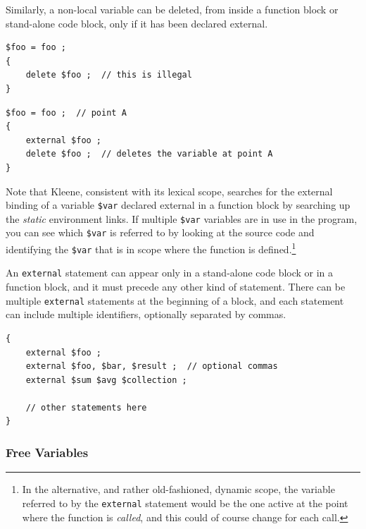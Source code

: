 \documentclass[letterpaper,12pt]{article}
\begin{document}
\noindent
Similarly, a non-local variable can be deleted, from inside a
function block or stand-alone code block, only if it has been
declared external.

\begin{samepage}
\begin{Verbatim}[fontsize=\small]
$foo = foo ;
{
    delete $foo ;  // this is illegal
}
\end{Verbatim}
\end{samepage}

\begin{samepage}
\begin{Verbatim}[fontsize=\small]
$foo = foo ;  // point A
{
    external $foo ;
    delete $foo ;  // deletes the variable at point A
}
\end{Verbatim}
\end{samepage}

Note that Kleene, consistent with its lexical scope, searches for
the external binding of a variable \verb!$var! declared external in
a function block by
searching up the \emph{static} environment links.  If multiple
\verb!$var! variables are in use in the program, you can see
which \verb!$var! is referred to by
looking at the source code and identifying the \verb!$var! that
is in scope where the function is defined.\footnote{In the
alternative, and rather old-fashioned, dynamic scope, the variable
referred to by the \texttt{external} statement would be the one
active at the point where the function is \emph{called}, and this
could of course change for each call.}

An \texttt{external} statement can appear only in a stand-alone code block or in a
function block, and it must precede any other kind of statement.  There can be multiple
\texttt{external} statements at the beginning of a block, 
and each statement can include multiple
identifiers, optionally separated by commas.

\begin{samepage}
\begin{Verbatim}[fontsize=\small]
{
    external $foo ;
    external $foo, $bar, $result ;  // optional commas
    external $sum $avg $collection ;

    // other statements here
}
\end{Verbatim}
\end{samepage}


\subsubsection{Free Variables}
\end{document}
